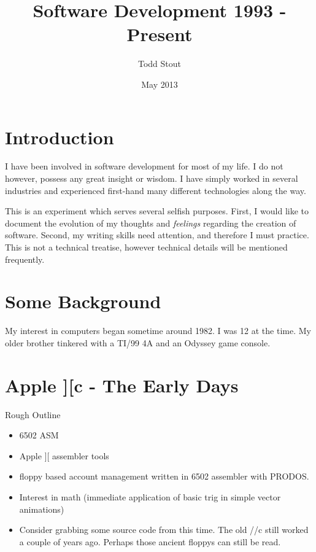 \documentclass[12pt]{report}
\title{Software Development 1993 - Present}
\author{Todd Stout}
\date{May 2013}
\begin{document}
\maketitle

\section{Introduction}
I have been involved in software development for most of my life. I do
not however, possess any great insight or wisdom. I have simply worked
in several industries and experienced first-hand many different
technologies along the way.

This is an experiment which serves several selfish purposes. First, I
would like to document the evolution of my thoughts and
\emph{feelings} regarding the creation of software. Second, my writing
skills need attention, and therefore I must practice. This is not a technical
treatise, however technical details will be mentioned frequently.

\pagebreak

%
%
\section{Some  Background}
My interest in computers began sometime around 1982. I was 12 at the
time. My older brother tinkered with a TI/99 4A and an Odyssey game console.
		
\section{Apple ][c - The Early Days}
	Rough Outline
	\begin{itemize}
	\item 6502 ASM
	\item Apple ][ assembler tools
	\item floppy based account management written in 6502 assembler with PRODOS.
	\item Interest in math (immediate application of basic trig in simple vector animations)
	\item Consider grabbing some source code from this time. The old //c still worked a couple of years ago. Perhaps those ancient floppys can still be read.
	\end{itemize}
	
\end{document}
